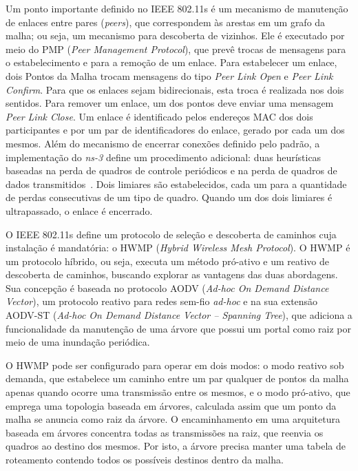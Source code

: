 \documentclass[letterpaper, 10 pt, conference]{ieeeconf}  %
\begin{document}
Um ponto importante definido no IEEE 802.11s é um mecanismo de manutenção de enlaces entre pares (\textit{peers}), que correspondem às arestas em um grafo da malha; ou seja, um mecanismo para descoberta de vizinhos. Ele é executado por meio do PMP (\textit{Peer Management Protocol}), que prevê trocas de mensagens para o estabelecimento e para a remoção de um enlace. Para estabelecer um enlace, dois Pontos da Malha trocam mensagens do tipo \textit{Peer Link Open} e \textit{Peer Link Confirm}. Para que os enlaces sejam bidirecionais, esta troca é realizada nos dois sentidos. Para remover um enlace, um dos pontos deve enviar uma mensagem \textit{Peer Link Close}. Um enlace é identificado pelos endereços MAC dos dois participantes e por um par de identificadores do enlace, gerado por cada um dos mesmos. Além do mecanismo de encerrar conexões definido pelo padrão, a implementação do \textit{ns-3} define um procedimento adicional: duas heurísticas baseadas na perda de quadros de controle periódicos e na perda de quadros de dados transmitidos~\cite{andreevsite}. Dois limiares são estabelecidos, cada um para a quantidade de perdas consecutivas de um tipo de quadro. Quando um dos dois limiares é ultrapassado, o enlace é encerrado.

O IEEE 802.11s define um protocolo de seleção e descoberta de caminhos cuja instalação é mandatória: o HWMP (\textit{Hybrid Wireless Mesh Protocol}). O HWMP é um protocolo híbrido, ou seja, executa um método pró-ativo e um reativo de descoberta de caminhos, buscando explorar as vantagens das duas abordagens. Sua concepção é baseada no protocolo AODV (\textit{Ad-hoc On Demand Distance Vector}), um protocolo reativo para redes sem-fio \textit{ad-hoc} e na sua extensão AODV-ST (\textit{Ad-hoc On Demand Distance Vector -- Spanning Tree}), que adiciona a funcionalidade da manutenção de uma árvore que possui um portal como raiz por meio de uma inundação periódica.

O HWMP pode ser configurado para operar em dois modos: o modo reativo sob demanda, que estabelece um caminho entre um par qualquer de pontos da malha apenas quando ocorre uma transmissão entre os mesmos, e o modo pró-ativo, que emprega uma topologia baseada em árvores, calculada assim que um ponto da malha se anuncia como raiz da árvore. O encaminhamento em uma arquitetura baseada em árvores concentra todas as transmissões na raiz, que reenvia os quadros ao destino dos mesmos. Por isto, a árvore precisa manter uma tabela de roteamento contendo todos os possíveis destinos dentro da malha.
\end{document}
